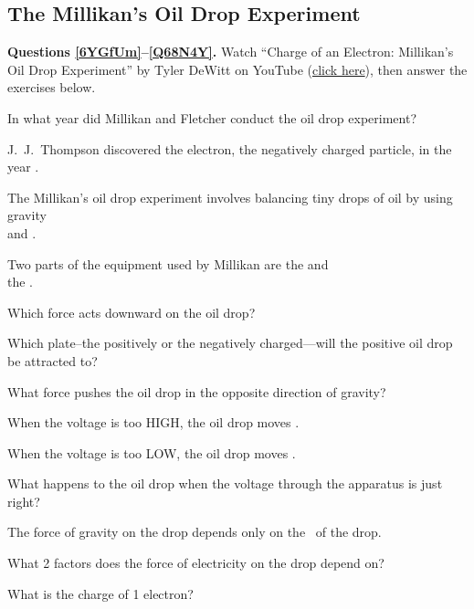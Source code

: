 \documentclass[]{exam}
\begin{document}
\subsection*{The Millikan's Oil Drop Experiment}

\textbf{Questions \ref{6YGfUm}--\ref{Q68N4Y}.} Watch ``Charge of an Electron: Millikan's Oil Drop Experiment'' by Tyler DeWitt on YouTube (\href{https://youtu.be/2HhaQtvICe8}{click here}), then answer the exercises below.

\begin{questions}

\begin{doublespace}
    

\question \label{6YGfUm}
In what year did Millikan and Fletcher conduct the oil drop experiment? \fillin[][3cm]


\question
J.~J.~Thompson discovered the electron, the negatively charged particle, in the year \fillin[][3cm].


\question
The Millikan's oil drop experiment involves balancing tiny drops of oil by using gravity\\and \fillin[][2.5cm].



\question
Two parts of the equipment used by Millikan are the \fillin[][3cm] and\\the \fillin[][3cm].


\question
Which force acts downward on the oil drop? \fillin[][3cm]


\question
Which plate--the positively or the negatively charged---will the positive oil drop be attracted to? 

\fillwithlines{7mm}


\question
What force pushes the oil drop in the opposite direction of gravity? \fillin[][3cm]


\question
When the voltage is too HIGH, the oil drop moves \fillin[][4cm].


\question
When the voltage is too LOW, the oil drop moves \fillin[][4cm].


\question
What happens to the oil drop when the voltage through the apparatus is just right?

\fillwithlines{7mm}


\question
The force of gravity on the drop depends only on the \fillin[][3cm]\ of the drop.


\question
What 2 factors does the force of electricity on the drop depend on?

\fillwithlines{7mm}


\question \label{Q68N4Y}
What is the charge of 1 electron? \fillin[][3cm]

\end{doublespace}

\end{questions}
\end{document}
